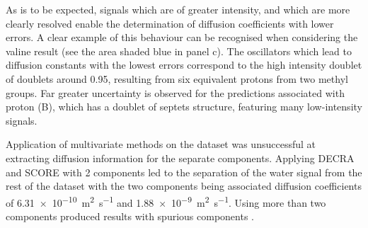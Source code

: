 As is to be expected, signals which are of greater intensity, and which are
more clearly resolved enable the determination of diffusion coefficients with
lower errors. A clear example of this behaviour can be recognised when
considering the valine result (see the area shaded blue in panel c). The
oscillators which lead to diffusion constants with the lowest errors correspond to
the high intensity doublet of doublets around \qty{0.95}{\partspermillion},
resulting from six equivalent protons from two methyl groups. Far
greater uncertainty is observed for the predictions associated with proton (B),
which has a doublet of septets structure, featuring many low-intensity signals.

Application of multivariate methods on the dataset was unsuccessful at
extracting diffusion information for the separate components. Applying
\ac{DECRA} and \ac{SCORE} with 2 components led to the separation of the water
signal from the rest of the dataset with the two components being associated
diffusion coefficients of \qty{6.31e-10}{\meter\squared\per\second}
and \qty{1.88e-9}{\meter\squared\per\second}. Using more than two
components produced results with spurious components .
